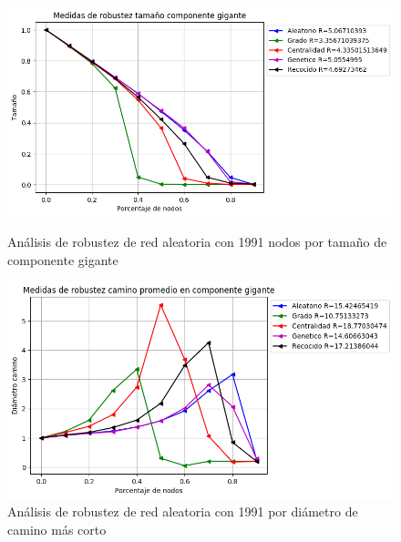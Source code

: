 \begin{figure}[!htb]
    \begin{minipage}{0.48\textwidth}
        \centering
        \includegraphics[scale=0.4]{CapituloAAnexos/imagenesAnexoC/Robustez/grafica_GC20180501_072543Random1991Nodes5939}
        \caption{Análisis de robustez de red aleatoria con 1991 nodos por tamaño de componente gigante}
    \end{minipage}\hfill
   \begin{minipage}{0.48\textwidth}
         \centering
       \includegraphics[scale=0.4]{CapituloAAnexos/imagenesAnexoC/Robustez/grafica_APL20180501_072543Random1991Nodes5939}
        \caption{Análisis de robustez de red aleatoria con 1991 por diámetro de camino más corto}
    \end{minipage}
\end{figure}

